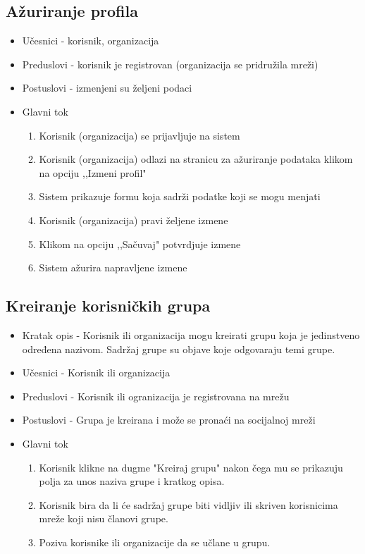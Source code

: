 \subsection{Ažuriranje profila}
\begin{itemize}
\item Učesnici - korisnik, organizacija
\item Preduslovi - korisnik je registrovan (organizacija se pridružila mreži)
\item Postuslovi - izmenjeni su željeni podaci
\item Glavni tok
\begin{enumerate}
\item Korisnik (organizacija) se prijavljuje na sistem
\item Korisnik (organizacija) odlazi na stranicu za ažuriranje podataka klikom na opciju ,,Izmeni profil"
\item Sistem prikazuje formu koja sadrži podatke koji se mogu menjati
\item Korisnik (organizacija) pravi željene izmene
\item Klikom na opciju ,,Sačuvaj" potvrdjuje izmene
\item Sistem ažurira napravljene izmene
\end{enumerate}
\end{itemize}

\subsection{Kreiranje korisničkih grupa}
\begin{itemize}
\item Kratak opis - Korisnik ili organizacija mogu kreirati grupu koja je jedinstveno određena nazivom. Sadržaj grupe su objave koje odgovaraju temi grupe.
\item Učesnici - Korisnik ili organizacija
\item Preduslovi - Korisnik ili ogranizacija je registrovana na mrežu
\item Postuslovi - Grupa je kreirana i može se pronaći na socijalnoj mreži 
\item Glavni tok
    \begin{enumerate}
	\item Korisnik klikne na dugme "Kreiraj grupu" nakon čega mu se prikazuju polja za unos naziva grupe i kratkog opisa.
	\item Korisnik bira da li će sadržaj grupe biti vidljiv ili skriven korisnicima mreže koji nisu članovi grupe.
	\item Poziva korisnike ili organizacije da se učlane u grupu.
    \end{enumerate}
\end{itemize}


